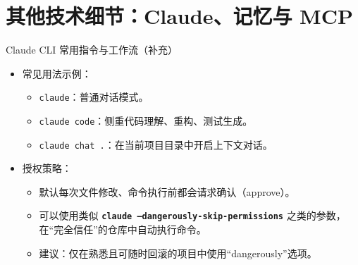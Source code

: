 \documentclass[10pt,aspectratio=169]{beamer}
\begin{document}
\section{其他技术细节：Claude、记忆与 MCP}

\begin{frame}{Claude CLI 常用指令与工作流（补充）}
  \begin{itemize}
    \item 常见用法示例：
      \begin{itemize}
        \item \texttt{claude}：普通对话模式。
        \item \texttt{claude code}：侧重代码理解、重构、测试生成。
        \item \texttt{claude chat .}：在当前项目目录中开启上下文对话。
      \end{itemize}
    \item 授权策略：
      \begin{itemize}
        \item 默认每次文件修改、命令执行前都会请求确认（approve）。
        \item 可以使用类似 \textbf{\texttt{claude --dangerously-skip-permissions}} 之类的参数，在“完全信任”的仓库中自动执行命令。
        \item 建议：仅在熟悉且可随时回滚的项目中使用“dangerously”选项。
      \end{itemize}
  \end{itemize}
\end{frame}
\end{document}
